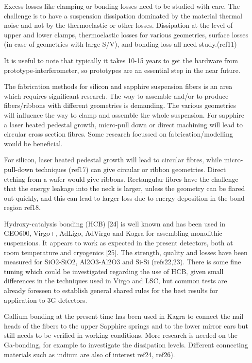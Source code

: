Excess losses like clamping or bonding losses need to be studied with care. The challenge is to have a suspension dissipation dominated by the material thermal noise and not by the thermoelastic or other losses. Dissipation at the level of upper and lower clamps, thermoelastic losses for various geometries, surface losses (in case of geometries with large S/V), and bonding loss all need study.(ref11)

It is useful to note that typically it takes 10-15 years to get the hardware from prototype-interferometer, so prototypes are an essential step in the near future.

The fabrication methods for silicon and sapphire suspension fibers is an area which requires significant research. The way to assemble and/or to produce fibers/ribbons with different geometries is demanding. The various geometries will influence the way to clamp and assemble the whole suspension. For sapphire a laser heated pedestal growth, micro-pull down or direct machining will lead to circular cross section fibres. Some research focussed on fabrication/modelling would be beneficial.

For silicon, laser heated pedestal growth will lead to circular fibres, while micro-pull-down techniques (ref17) can give circular or ribbon geometries. Direct etching from a wafer would give ribbons. Rectangular fibres have the challenge that the energy leakage into the neck is larger, unless the geometry can be flared out quickly, and this can lead to larger loss due to energy deposition in the bond region ref18.


Hydroxy-catalysis bonding (HCB) [24] is well known and has been used in GEO600, Virgo+, AdLigo, AdVirgo and Kagra for assembling monolithic suspensions.  It appears to work as expected in the present detectors, both at room temperature and cryogenics [25]. The strength, quality and losses have been measured for SiO2-SiO2, Al2O3-Al2O3 and Si-Si (refs22,23).   There is some fine tuning which could be investigated regarding the use of HCB, given small differences in the techniques used in Virgo and LSC, but common tests are already foreseen to establish general shared rules for the best results for application to 3G detectors.

Gallium bonding at the present time has been used in Kagra to connect the nail heads of the fibers to the upper Sapphire springs and to the lower mirror ears but still needs to be verified in working conditions,  More research is needed on the Ga-bonding, for example to  investigate the dissipation levels.  Different connecting materials such as indium are also of interest ref24, ref26). 

